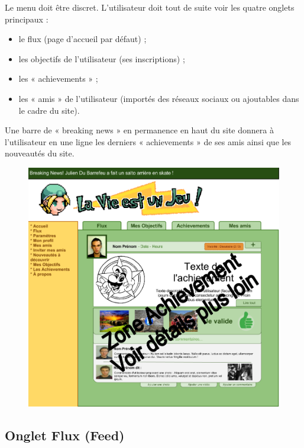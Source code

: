 \documentclass{life-fr}
\begin{document}
Le menu doit être discret. L'utilisateur doit tout de suite voir les quatre onglets principaux :

\begin{itemize}
  \item le flux (page d'accueil par défaut) ;
  \item les objectifs de l'utilisateur (ses inscriptions) ;
  \item les « achievements » ;
  \item les « amis » de l'utilisateur (importés des réseaux sociaux ou ajoutables dans le cadre du site).
\end{itemize}

Une barre de « breaking news » en permanence en haut du site donnera à l'utilisateur en une ligne les derniers « achievements » de ses amis ainsi que les nouveautés du site.

\begin{figure}[H]
  \begin{center}
    \includegraphics[width=15cm]{img/accueil.png}
  \end{center}
\end{figure}


\subsection{Onglet Flux (Feed)}
\end{document}
